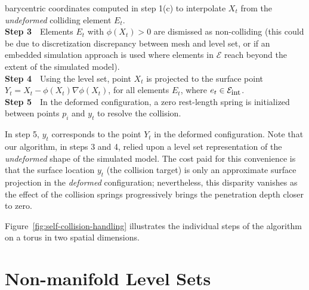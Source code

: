   barycentric coordinates computed in step 1(c) to interpolate $X_t$
  from the \emph{undeformed} colliding element $E_t$.
  \\
  \textbf{Step 3}\ \ Elements $E_t$ with $\phi(X_t)\!\!>\!\!0$ are
  dismissed as non-colliding (this could be due to discretization
  discrepancy between mesh and level set, or if an embedded simulation
  approach is used where elements in $\mathcal{E}$ reach beyond the
  extent of the simulated model).
  \\
  \textbf{Step 4}\ \ Using the level set, point $X_t$ is projected to
  the surface point $Y_t=X_t\!-\!\phi(X_t)\nabla\phi(X_t)$, for all
  elements $E_t$, where $e_t\in\mathcal{E}_{\mbox{\small int}}$.
  \\
  \textbf{Step 5}\ \ In the deformed configuration, a zero rest-length
  spring is initialized between points $p_i$ and $y_t$ to resolve the
  collision.

  In step 5, $y_t$ corresponds to the point $Y_t$ in the deformed
  configuration.  Note that our algorithm, in steps 3 and 4, relied
  upon a level set representation of the \emph{undeformed} shape of
  the simulated model. The cost paid for this convenience is that the
  surface location $y_t$ (the collision target) is only an approximate
  surface projection in the \emph{deformed} configuration;
  nevertheless, this disparity vanishes as the effect of the collision
  springs progressively brings the penetration depth closer to zero.

Figure~\ref{fig:self-collision-handling} illustrates the
individual steps of the algorithm on a torus in two spatial
dimensions.


\section{Non-manifold Level Sets}
\label{sec:non-manifold-level-sets}

